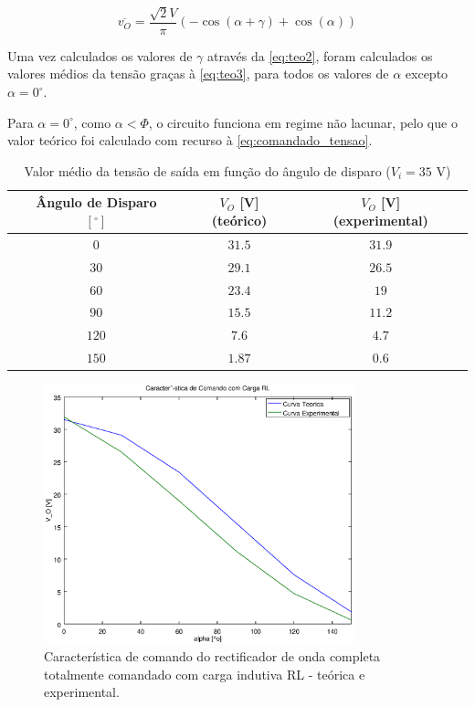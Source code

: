 \documentclass[a4paper,11pt]{article}
\numberwithin{equation}{section}
\begin{document}
\begin{equation}
\label{eq:teo4}
\overline{v_O} = \frac{\sqrt{2}V}{\pi} \left(-\cos{(\alpha + \gamma)}+\cos{(\alpha)}\right)
\end{equation}

Uma vez calculados os valores de $\gamma$ através da \autoref{eq:teo2}, foram calculados os valores médios da tensão graças à \autoref{eq:teo3}, para todos os valores de $\alpha$ excepto $\alpha = 0^\circ$.

Para $\alpha = 0^\circ$, como $\alpha < \Phi$, o circuito funciona em regime não lacunar, pelo que o valor teórico foi calculado com recurso à \autoref{eq:comandado_tensao}.

\begin{table}[H]
\centering
\begin{tabular}{c c c c c c c}
\hfil & Ângulo de Disparo $[^\circ]$ & \hfil & $V_O$ [V] (teórico) & \hfil & $V_O$ [V] (experimental) & \hfil \\
\hline
			&$0$&	&$31.5$&		&$31.9$&\\
\rowcolor{SkyBlue}	&$30$&	&$29.1$&		&$26.5$&\\
			&$60$&	&$23.4$&		&$19$&\\
\rowcolor{SkyBlue}	&$90$&	&$15.5$&		&$11.2$&\\
			&$120$&	&$7.6$&			&$4.7$&\\
\rowcolor{SkyBlue}	&$150$&	&$1.87$&		&$0.6$&\\
\hline
\end{tabular}
\caption{Valor médio da tensão de saída em função do ângulo de disparo ($V_i = 35$ V)}
\label{tab:akpklac}
\end{table}

\begin{figure}[H]
	\centering
	\includegraphics[keepaspectratio=true, width=0.8\textwidth]{img/comando2}
	\caption{Característica de comando do rectificador de onda completa totalmente comandado com carga indutiva RL - teórica e experimental.}
	\label{fig:comando2}
	\vspace{-0.8em}
\end{figure}
\end{document}
